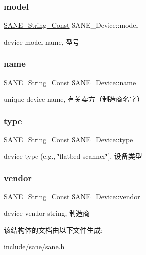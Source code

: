 \subsubsection{\texorpdfstring{model}{model}}
{\footnotesize\ttfamily \hyperlink{sane_8h_a9a47323dab2a36db080f1bcc11585af4}{S\+A\+N\+E\+\_\+\+String\+\_\+\+Const} S\+A\+N\+E\+\_\+\+Device\+::model}

device model name, 型号 \mbox{\label{structSANE__Device_a6ade6e5e2cf659520c0ceae0c50adc55}} 
\subsubsection{\texorpdfstring{name}{name}}
{\footnotesize\ttfamily \hyperlink{sane_8h_a9a47323dab2a36db080f1bcc11585af4}{S\+A\+N\+E\+\_\+\+String\+\_\+\+Const} S\+A\+N\+E\+\_\+\+Device\+::name}

unique device name, 有关卖方（制造商名字） \mbox{\label{structSANE__Device_ac66eea9d60c35fea4af804e6fecbe473}} 
\subsubsection{\texorpdfstring{type}{type}}
{\footnotesize\ttfamily \hyperlink{sane_8h_a9a47323dab2a36db080f1bcc11585af4}{S\+A\+N\+E\+\_\+\+String\+\_\+\+Const} S\+A\+N\+E\+\_\+\+Device\+::type}

device type (e.\+g., \char`\"{}flatbed scanner\char`\"{}), 设备类型 \mbox{\label{structSANE__Device_a30329d1b829b0d7308c31e18f8a81ccf}} 
\subsubsection{\texorpdfstring{vendor}{vendor}}
{\footnotesize\ttfamily \hyperlink{sane_8h_a9a47323dab2a36db080f1bcc11585af4}{S\+A\+N\+E\+\_\+\+String\+\_\+\+Const} S\+A\+N\+E\+\_\+\+Device\+::vendor}

device vendor string, 制造商 

该结构体的文档由以下文件生成\+:\begin{DoxyCompactItemize}
\item 
include/sane/\hyperlink{sane_8h}{sane.\+h}\end{DoxyCompactItemize}
